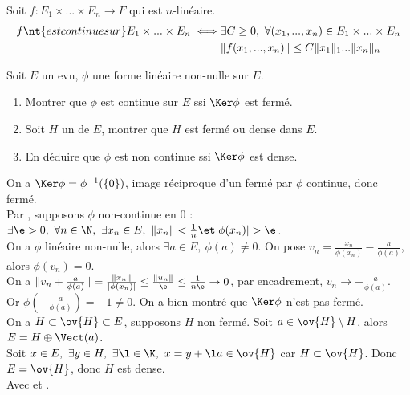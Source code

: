 \documentclass[11pt]{article}
\begin{document}
\vspace*{-0.7cm}

\begin{prop}{}{}
    Soit $f:E_1\times ... \times E_n \to F$ qui est $n$-linéaire.
    \begin{align*}
        f \nt{ est continue sur } E_1\times...\times E_n \iff& \exists C \geq 0, ~ \forall (x_1,...,x_n)\in E_1\times...\times E_n\\
        &\|f(x_1,...,x_n)\| \leq C\|x_1\|_1 ... \|x_n\|_n
    \end{align*}
\end{prop}

\vspace*{-0.7cm}

\begin{ex}{}{}
    Soit $E$ un evn, $\phi$ une forme linéaire non-nulle sur $E$.
    \begin{enumerate}
        \item Montrer que $\phi$ est continue sur $E$ ssi $\Ker\phi$ est fermé.
        \item Soit $H$ un  de $E$, montrer que $H$ est fermé ou dense dans $E$.
        \item En déduire que $\phi$ est non continue ssi $\Ker\phi$ est dense.
    \end{enumerate}
    \tcblower
     On a $\Ker \phi = \phi^{-1}(\{0\})$, image réciproque d'un fermé par $\phi$ continue, donc fermé.\\
     Par , supposons $\phi$ non-continue en $0$ : $\exists \e > 0, ~ \forall n \in \N, ~ \exists x_n \in E, ~ \|x_n\|<\frac{1}{n} \et |\phi(x_n)|>\e$.\\
    On a $\phi$ linéaire non-nulle, alors $\exists a \in E, ~ \phi(a) \neq 0$. On pose $v_n=\frac{x_n}{\phi(x_n)}-\frac{a}{\phi(a)}$, alors $\phi(v_n)=0$.\\
    On a $\|v_n+\frac{a}{\phi(a)}\|=\frac{\|x_n\|}{|\phi(x_n)|}\leq\frac{\|u_n\|}{\e}\leq\frac{1}{n\e}\to0$, par encadrement, $v_n\to-\frac{a}{\phi(a)}$.\\
    Or $\phi(-\frac{a}{\phi(a)})=-1\neq0$. On a bien montré que $\Ker\phi$ n'est pas fermé.\\
     On a $H\subset \ov{H} \subset E$, supposons $H$ non fermé. Soit $a\in\ov{H}\setminus H$, alors $E=H\oplus\Vect(a)$.\\
    Soit $x\in E, ~ \exists y \in H, ~ \exists \l \in \K, ~ x = y + \l a \in \ov{H}$ car $H\subset\ov{H}$. Donc $E=\ov{H}$, donc $H$ est dense.\\
     Avec  et . 
\end{ex}
\end{document}
